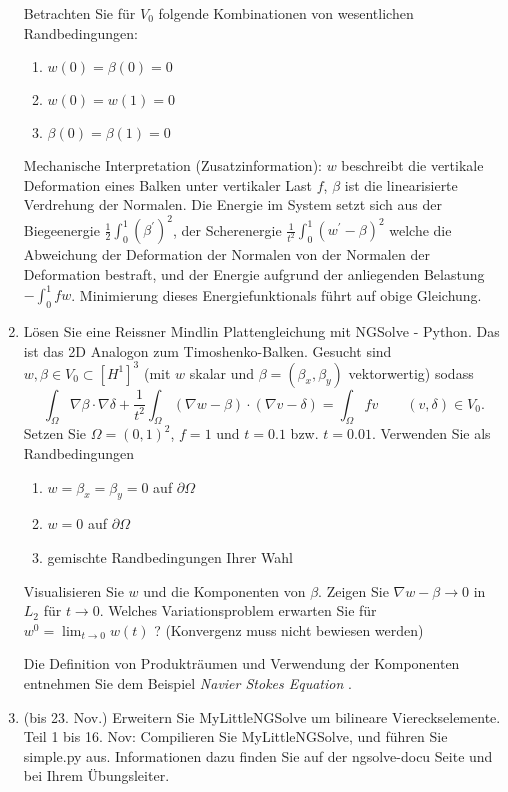 \documentclass[11pt,a4paper]{report}
\begin{document}
\begin{enumerate}
Betrachten Sie f\"ur $V_0$ folgende Kombinationen von wesentlichen Randbedingungen:
\begin{enumerate}
\item $w(0) = \beta(0) = 0$
\item $w(0) = w(1) = 0$
\item $\beta(0) = \beta(1) = 0$
\end{enumerate}

Mechanische Interpretation (Zusatzinformation): $w$ beschreibt die
vertikale Deformation eines Balken unter vertikaler Last $f$, $\beta$
ist die linearisierte Verdrehung der Normalen. Die Energie im System
setzt sich aus der Biegeenergie $\frac{1}{2} \int_0^1 (\beta^\prime)^2$,
der Scherenergie $\frac{1}{t^2} \int_0^1 (w^\prime - \beta)^2$ welche die
Abweichung der Deformation der Normalen von der Normalen der
Deformation bestraft, und der Energie aufgrund der anliegenden
Belastung $-\int_0^1 f w$. Minimierung dieses Energiefunktionals f\"uhrt
auf obige Gleichung.

\item L\"osen Sie eine Reissner Mindlin Plattengleichung mit NGSolve -
  Python. Das ist das 2D Analogon zum Timoshenko-Balken.
Gesucht sind $w, \beta \in V_0 \subset [H^1]^3$ (mit $w$
  skalar und $\beta = (\beta_x, \beta_y)$ vektorwertig) sodass
$$
\int_\Omega \nabla \beta \cdot \nabla \delta + \frac{1}{t^2}
\int_\Omega (\nabla w - \beta) \cdot (\nabla v - \delta) = 
\int_\Omega f v  \qquad (v, \delta) \in V_0.
$$
Setzen Sie $\Omega = (0,1)^2$, $f = 1$ und $t = 0.1$ bzw. $t = 0.01$.
Verwenden Sie als Randbedingungen 
\begin{enumerate}
\item $w = \beta_x = \beta_y = 0$ auf $\partial \Omega$
\item $w = 0$  auf $\partial \Omega$
\item gemischte Randbedingungen Ihrer Wahl
\end{enumerate}
Visualisieren Sie $w$ und die Komponenten von $\beta$. Zeigen Sie
$\nabla w - \beta \rightarrow 0$ in $L_2$ f\"ur $t \rightarrow 0$. \newline
Welches Variationsproblem erwarten Sie f\"ur $w^0 = \lim_{t
    \rightarrow 0} w(t)$ ? (Konvergenz muss nicht bewiesen werden)

Die Definition von Produktr\"aumen und Verwendung der Komponenten
entnehmen Sie dem Beispiel {\it Navier Stokes Equation }.

\item (bis 23. Nov.) Erweitern Sie MyLittleNGSolve um bilineare
  Viereckselemente. 
Teil 1 bis 16. Nov: Compilieren Sie MyLittleNGSolve, und f\"uhren Sie
simple.py aus.  Informationen dazu finden Sie auf der ngsolve-docu
Seite und bei Ihrem \"Ubungsleiter.



\end{enumerate}
\end{document}
